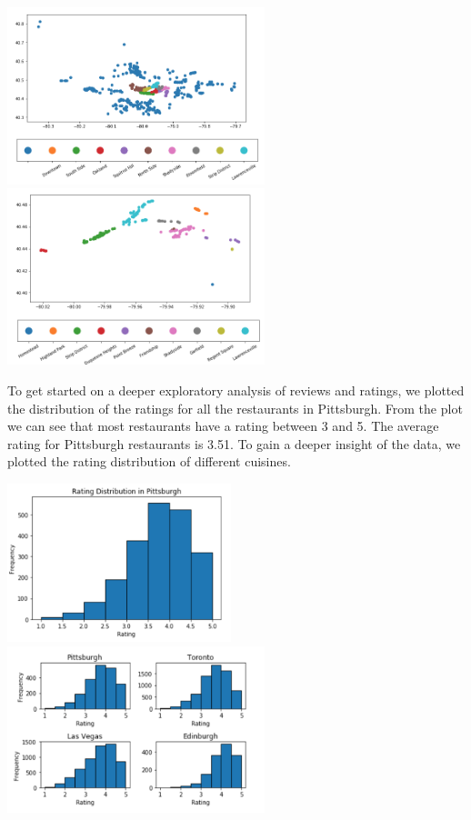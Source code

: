\documentclass{neu_handout}
\begin{document}
\begin{center}
\includegraphics[width=75mm,scale=0.5]{pitts_hoods_most_restaurants}
\includegraphics[width=75mm,scale=0.5]{top_10_most_popular_neighborhoods}
\end{center}

To get started on a deeper exploratory analysis of reviews and ratings, we plotted the distribution of the ratings for all the restaurants in Pittsburgh. From the plot we can see that most restaurants have a rating between 3 and 5. The average rating for Pittsburgh restaurants is 3.51. To gain a deeper insight of the data, we plotted the rating distribution of different cuisines. 

\begin{center}
	\includegraphics[width=65mm,scale=0.3]{rating_distribution_in_Pittsburgh}
	\includegraphics[width=75mm,scale=0.3]{rating_distribution_vs_countries}
\end{center}
\end{document}

